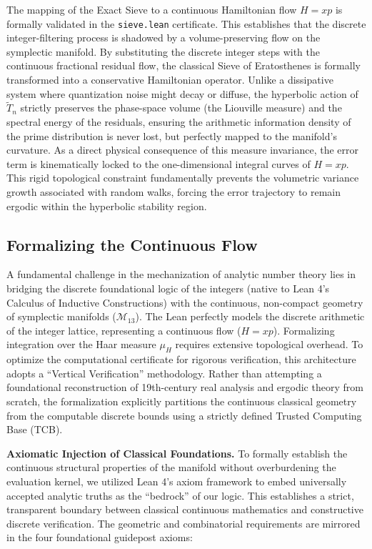 \documentclass[sn-mathphys-num, pdflatex]{sn-jnl}
\begin{document}
The mapping of the Exact Sieve to a continuous Hamiltonian flow $H=xp$ is formally validated in the \texttt{sieve.lean} certificate. This establishes that the discrete integer-filtering process is shadowed by a volume-preserving flow on the symplectic manifold. By substituting the discrete integer steps with the continuous fractional residual flow, the classical Sieve of Eratosthenes is formally transformed into a conservative Hamiltonian operator. Unlike a dissipative system where quantization noise might decay or diffuse, the hyperbolic action of $\tilde{T}_n$ strictly preserves the phase-space volume (the Liouville measure) and the spectral energy of the residuals, ensuring the arithmetic information density of the prime distribution is never lost, but perfectly mapped to the manifold's curvature. As a direct physical consequence of this measure invariance, the error term is kinematically locked to the one-dimensional integral curves of $H=xp$. This rigid topological constraint fundamentally prevents the volumetric variance growth associated with random walks, forcing the error trajectory to remain ergodic within the hyperbolic stability region.

\subsection{Formalizing the Continuous Flow}
\label{sec:epistemology}

A fundamental challenge in the mechanization of analytic number theory lies in bridging the discrete foundational logic of the integers (native to Lean 4's Calculus of Inductive Constructions) with the continuous, non-compact geometry of symplectic manifolds ($\mathcal{M}_{13}$). The Lean perfectly models the discrete arithmetic of the integer lattice, representing a continuous flow ($H=xp$). Formalizing integration over the Haar measure $\mu_H$ requires extensive topological overhead. To optimize the computational certificate for rigorous verification, this architecture adopts a ``Vertical Verification'' methodology. Rather than attempting a foundational reconstruction of 19th-century real analysis and ergodic theory from scratch, the formalization explicitly partitions the continuous classical geometry from the computable discrete bounds using a strictly defined Trusted Computing Base (TCB).

\textbf{Axiomatic Injection of Classical Foundations.}
To formally establish the continuous structural properties of the manifold without overburdening the evaluation kernel, we utilized Lean 4's axiom framework to embed universally accepted analytic truths as the ``bedrock'' of our logic. This establishes a strict, transparent boundary between classical continuous mathematics and constructive discrete verification. The geometric and combinatorial requirements are mirrored in the four foundational guidepost axioms:
\end{document}
